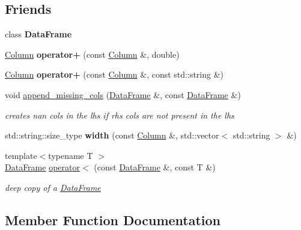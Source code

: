 \subsection*{Friends}
\begin{DoxyCompactItemize}
\item 
\mbox{\label{classColumn_ac3cf826bc43b8ab4740915b5c60e7166}} 
class {\bfseries Data\+Frame}
\item 
\mbox{\label{classColumn_a0073d63e1317b7b2bad1c4daa275b0ba}} 
\hyperlink{classColumn}{Column} {\bfseries operator+} (const \hyperlink{classColumn}{Column} \&, double)
\item 
\mbox{\label{classColumn_a07ec03095bd9fec0ccdccafcadef8ea2}} 
\hyperlink{classColumn}{Column} {\bfseries operator+} (const \hyperlink{classColumn}{Column} \&, const std\+::string \&)
\item 
void \hyperlink{classColumn_a27cc8acd51a5cd40e6a2726368914661}{append\+\_\+missing\+\_\+cols} (\hyperlink{classDataFrame}{Data\+Frame} \&, const \hyperlink{classDataFrame}{Data\+Frame} \&)
\begin{DoxyCompactList}\small\item\em creates nan cols in the lhs if rhs cols are not present in the lhs \end{DoxyCompactList}\item 
\mbox{\label{classColumn_acbe8416c515df226506ae71d8c6fd05a}} 
std\+::string\+::size\+\_\+type {\bfseries width} (const \hyperlink{classColumn}{Column} \&, std\+::vector$<$ std\+::string $>$ \&)
\item 
{\footnotesize template$<$typename T $>$ }\\\hyperlink{classDataFrame}{Data\+Frame} \hyperlink{classColumn_a92ccb0425c54a5b5cd6f78ed1bb4c3ff}{operator$<$} (const \hyperlink{classDataFrame}{Data\+Frame} \&, const T \&)
\begin{DoxyCompactList}\small\item\em deep copy of a \hyperlink{classDataFrame}{Data\+Frame} \end{DoxyCompactList}\end{DoxyCompactItemize}


\subsection{Member Function Documentation}
\mbox{\label{classColumn_a9f7b60a5645dd0b604922ad10f0a4528}} 
